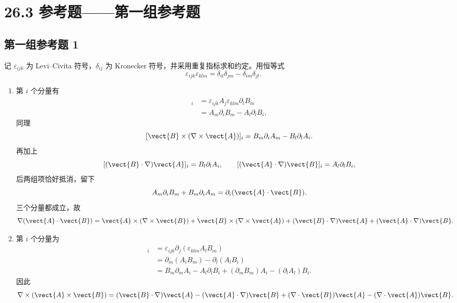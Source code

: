 \section*{26.3 参考题——第一组参考题}

\subsection*{第一组参考题 1}
\begin{xsolution}
记 $\varepsilon_{ijk}$ 为 Levi--Civita 符号，$\delta_{ij}$ 为 Kronecker 符号，并采用重复指标求和约定。用恒等式
\[
  \varepsilon_{ijk}\varepsilon_{klm}
  =\delta_{il}\delta_{jm}-\delta_{im}\delta_{jl}.
\]

\begin{enumerate}[label=(\arabic*)]
  \item 第 $i$ 个分量有
  \begin{align*}
    [\vect{A}\times(\nabla\times\vect{B})]_i
    &=\varepsilon_{ijk}A_j\varepsilon_{klm}\partial_lB_m\\
    &=A_m\partial_iB_m-A_l\partial_lB_i,
  \end{align*}
  同理
  \[
    [\vect{B}\times(\nabla\times\vect{A})]_i
    =B_m\partial_iA_m-B_l\partial_lA_i.
  \]
  再加上
  \[
    [(\vect{B}\cdot\nabla)\vect{A}]_i=B_l\partial_lA_i,
    \qquad
    [(\vect{A}\cdot\nabla)\vect{B}]_i=A_l\partial_lB_i,
  \]
  后两组项恰好抵消，留下
  \[
    A_m\partial_iB_m+B_m\partial_iA_m
    =\partial_i(\vect{A}\cdot\vect{B}).
  \]
  三个分量都成立，故
  \[
    \nabla(\vect{A}\cdot\vect{B})
    =\vect{A}\times(\nabla\times\vect{B})
    +\vect{B}\times(\nabla\times\vect{A})
    +(\vect{B}\cdot\nabla)\vect{A}
    +(\vect{A}\cdot\nabla)\vect{B}.
  \]

  \item 第 $i$ 个分量为
  \begin{align*}
    [\nabla\times(\vect{A}\times\vect{B})]_i
    &=\varepsilon_{ijk}\partial_j(\varepsilon_{klm}A_lB_m)\\
    &=\partial_m(A_iB_m)-\partial_l(A_lB_i)\\
    &=B_m\partial_mA_i-A_l\partial_lB_i
      +(\partial_mB_m)A_i-(\partial_lA_l)B_i.
  \end{align*}
  因此
  \[
    \nabla\times(\vect{A}\times\vect{B})
    =(\vect{B}\cdot\nabla)\vect{A}
    -(\vect{A}\cdot\nabla)\vect{B}
    +(\nabla\cdot\vect{B})\vect{A}
    -(\nabla\cdot\vect{A})\vect{B}.
  \]
\end{enumerate}
\end{xsolution}

